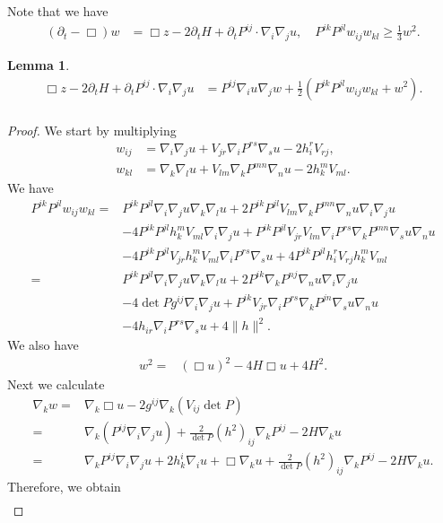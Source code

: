 \documentclass{amsart}
\newtheorem{lemma}[theorem]{Lemma}
\theoremstyle{definition}
\theoremstyle{remark}
\numberwithin{equation}{section}
\begin{document}
Note that we have
\begin{align}
(\partial_t-\Box)w
&=\Box z-2\partial_tH+\partial_tP^{ij}\cdot\nabla_i\nabla_ju,\quad P^{ik}P^{jl}w_{ij}w_{kl}\geq \frac{1}{3}w^2.
\end{align}
\begin{lemma}
\begin{align*}
\Box z-2\partial_tH+\partial_tP^{ij}\cdot\nabla_i\nabla_ju&=P^{ij}\nabla_i u\nabla_j w+ \frac{1}{2}\left(P^{ik}P^{jl}w_{ij}w_{kl}+w^2\right).\\
\end{align*}
\end{lemma}
\begin{proof}
We start by multiplying
\begin{align*}
w_{ij}&=\nabla_i\nabla_ju+V_{jr}\nabla_iP^{rs}\nabla_su-2h_i^rV_{rj},\\
w_{kl}&=\nabla_k\nabla_lu+V_{lm}\nabla_kP^{mn}\nabla_nu-2h_k^mV_{ml}.
\end{align*}
We have
\begin{align*}
P^{ik}P^{jl}w_{ij}w_{kl}=&P^{ik}P^{jl}\nabla_i\nabla_ju\nabla_k\nabla_lu+2P^{ik}P^{jl}V_{lm}\nabla_kP^{mn}\nabla_nu\nabla_i\nabla_ju\\
&-4P^{ik}P^{jl}h_k^mV_{ml}\nabla_i\nabla_ju+P^{ik}P^{jl}V_{jr}V_{lm}\nabla_iP^{rs}\nabla_kP^{mn}\nabla_su\nabla_nu\\
&-4P^{ik}P^{jl}V_{jr}h_k^mV_{ml}\nabla_iP^{rs}\nabla_su+4P^{ik}P^{jl}h_i^rV_{rj}h_k^mV_{ml}\\
=&P^{ik}P^{jl}\nabla_i\nabla_ju\nabla_k\nabla_lu+2P^{ik}\nabla_kP^{nj}\nabla_nu\nabla_i\nabla_ju\\
&-4\det P g^{ij}\nabla_i\nabla_ju+P^{ik}V_{jr}\nabla_iP^{rs}\nabla_kP^{jn}\nabla_su\nabla_nu\\
&-4h_{ir}\nabla_iP^{rs}\nabla_su+4\|h\|^2.
\end{align*}
We also have
\begin{align*}
w^2=&(\Box u)^2-4H\Box u+4H^2.
\end{align*}
Next we calculate
\begin{align*}
\nabla_k w=&\nabla_k\Box u-2g^{ij}\nabla_k(V_{ij}\det P)\\
=&\nabla_k(P^{ij}\nabla_i\nabla_j u)+\frac{2}{\det P}(h^2)_{ij}\nabla_kP^{ij}-2H\nabla_ku\\
=&\nabla_kP^{ij}\nabla_i\nabla_ju+2h_k^i\nabla_iu+\Box\nabla_ku+\frac{2}{\det P}(h^2)_{ij}\nabla_kP^{ij}-2H\nabla_ku.
\end{align*}
Therefore, we obtain
\begin{align*}

\end{align*}
\end{proof}
\end{document}
